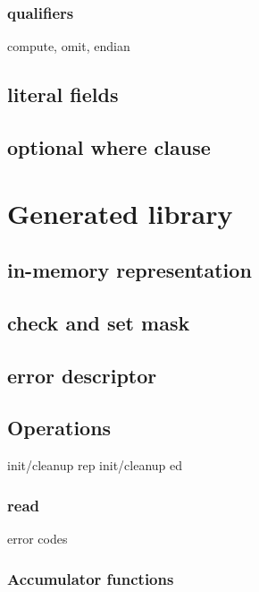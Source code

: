 \subsubsection{qualifiers}
 compute, omit, endian

\subsection{literal fields}

\subsection{optional where clause}

\section{Generated library}
\subsection{in-memory representation}
\subsection{check and set mask}
\subsection{error descriptor}
\subsection{Operations}
init/cleanup rep
init/cleanup ed
\subsubsection{read}
  error codes
\subsubsection{Accumulator functions}


